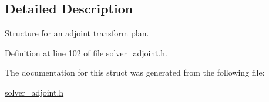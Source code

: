 \subsection{Detailed Description}
Structure for an adjoint transform plan. 

Definition at line 102 of file solver\_\-adjoint.h.

The documentation for this struct was generated from the following file:\begin{CompactItemize}
\item 
\hyperlink{solver__adjoint_8h}{solver\_\-adjoint.h}\end{CompactItemize}

